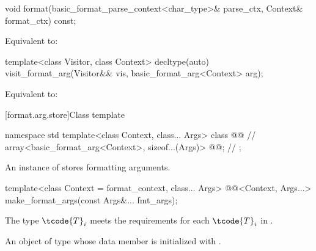 %
\begin{itemdecl}
void format(basic_format_parse_context<char_type>& parse_ctx, Context& format_ctx) const;
\end{itemdecl}

\begin{itemdescr}
\pnum
\effects
Equivalent to: 
\end{itemdescr}

%
\begin{itemdecl}
template<class Visitor, class Context>
  decltype(auto) visit_format_arg(Visitor&& vis, basic_format_arg<Context> arg);
\end{itemdecl}

\begin{itemdescr}
\pnum
\effects
Equivalent to: 
\end{itemdescr}

[format.arg.store]{Class template }

\begin{codeblock}
namespace std {
  template<class Context, class... Args>
  class @@ {                                      // \expos
    array<basic_format_arg<Context>, sizeof...(Args)> @@;     // \expos
  };
}
\end{codeblock}

\pnum
An instance of  stores formatting arguments.

%
\begin{itemdecl}
template<class Context = format_context, class... Args>
  @@<Context, Args...> make_format_args(const Args&... fmt_args);
\end{itemdecl}

\begin{itemdescr}
\pnum
\expects
The type
$\tcode{T}_i$\tcode{>}
meets the  requirements
for each $\tcode{T}_i$ in .

\pnum
\returns
An object of type 
whose  data member is initialized with
.
\end{itemdescr}


